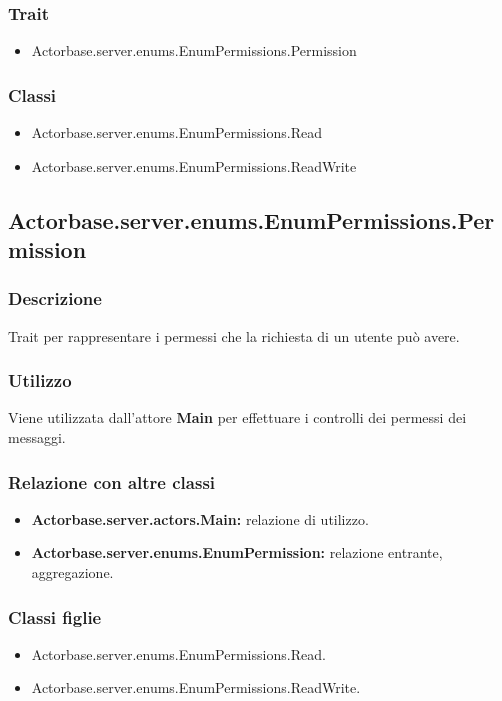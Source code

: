 \documentclass[a4paper]{article}
\begin{document}
			\subsubsection{Trait}
				\begin{itemize}
					\item Actorbase.server.enums.EnumPermissions.Permission
				\end{itemize}
				
			\subsubsection{Classi}
			\begin{itemize}
					\item Actorbase.server.enums.EnumPermissions.Read
					\item Actorbase.server.enums.EnumPermissions.ReadWrite
			\end{itemize}
		
		\subsection{Actorbase.server.enums.EnumPermissions.Permission}
			\subsubsection{Descrizione}
				Trait per rappresentare i permessi che la richiesta di un utente può avere.
				
			\subsubsection{Utilizzo}
				Viene utilizzata dall'attore \textbf{Main} per effettuare i controlli dei permessi dei messaggi. 				
				
			\subsubsection{Relazione con altre classi}
				\begin{itemize}
					\item \textbf{Actorbase.server.actors.Main:} relazione di utilizzo.
					\item \textbf{Actorbase.server.enums.EnumPermission:} relazione entrante, aggregazione.
				\end{itemize}
				
			\subsubsection{Classi figlie}
				\begin{itemize}
					\item Actorbase.server.enums.EnumPermissions.Read.
					\item Actorbase.server.enums.EnumPermissions.ReadWrite.
				\end{itemize}
				
\end{document}
